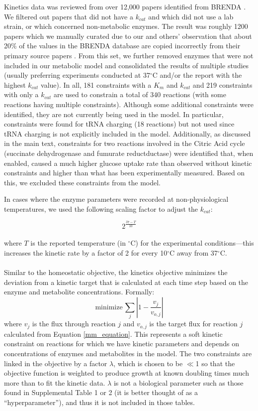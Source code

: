 \documentclass[12pt]{article}
\begin{document}
Kinetics data was reviewed from over 12,000 papers identified from BRENDA \cite{Schomburg:2013gp}.  We filtered out papers that did not have a $k_{cat}$ and which did not use a lab strain, or which concerned non-metabolic enzymes.  The result was roughly 1200 papers which we manually curated due to our and others' observation that about 20\% of the values in the BRENDA database are copied incorrectly from their primary source papers \cite{Bar2011}.  From this set, we further removed enzymes that were not included in our metabolic model and consolidated the results of multiple studies (usually preferring experiments conducted at 37\(^\circ\)C and/or the report with the highest $k_{cat}$ value).  In all, 181 constraints with a $K_m$ and $k_{cat}$ and 219 constraints with only a $k_{cat}$ are used to constrain a total of 340 reactions (with some reactions having multiple constraints).  Although some additional constraints were identified, they are not currently being used in the model.  In particular, constraints were found for tRNA charging (18 reactions) but not used since tRNA charging is not explicitly included in the model.  Additionally, as discussed in the main text, constraints for two reactions involved in the Citric Acid cycle (succinate dehydrogenase and fumurate reductductase) were identified that, when enabled, caused a much higher glucose uptake rate than observed without kinetic constraints and higher than what has been experimentally measured.  Based on this, we excluded these constraints from the model.

In cases where the enzyme parameters were recorded at non-physiological temperatures, we used the following scaling factor to adjust the $k_{cat}$:

\begin{equation}
2^{\frac{37 - T}{10}}
\end{equation}
\\
where \(T\) is the reported temperature (in \(^\circ\)C) for the experimental conditions---this increases the kinetic rate by a factor of 2 for every 10\(^\circ\)C away from 37\(^\circ\)C.\\
\\
Similar to the homeostatic objective, the kinetics objective minimizes the deviation from a kinetic target that is calculated at each time step based on the enzyme and metabolite concentrations.  Formally:
\begin{equation}
\mathrm{minimize } \, \sum_{j} \left| 1-\frac{v_j}{v_{o,j}} \right|
\end{equation}
where $v_j$ is the flux through reaction $j$ and $v_{o,j}$ is the target flux for reaction \(j\) calculated from Equation \ref{mm_equation}.  This represents a soft kinetic constraint on reactions for which we have kinetic parameters and depends on concentrations of enzymes and metabolites in the model. The two constraints are linked in the objective by a factor $\lambda$, which is chosen to be $\ll$1 so that the objective function is weighted to produce growth at known doubling times much more than to fit the kinetic data.  $\lambda$ is not a biological parameter such as those found in Supplemental Table 1 or 2 (it is  better thought of as a ``hyperparameter''), and thus it is not included in those tables.
\end{document}
